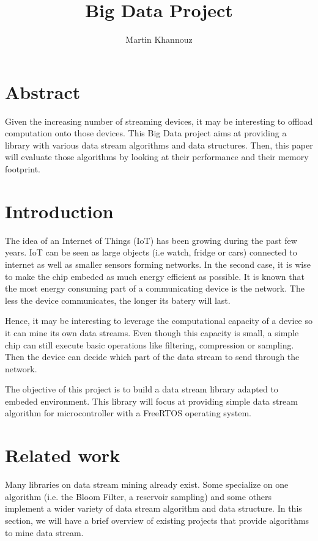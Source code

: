 \documentclass{article}
\title{Big Data Project}
\author{Martin Khannouz}
\begin{document}
\maketitle

\section*{Abstract}
Given the increasing number of streaming devices, it may be interesting to offload computation onto those devices.
This Big Data project aims at providing a library with various data stream algorithms and data structures.
Then, this paper will evaluate those algorithms by looking at their performance and their memory footprint.

\section{Introduction}
The idea of an Internet of Things (IoT) has been growing during the past few years.
IoT can be seen as large objects (i.e watch, fridge or cars) connected to internet as
well as smaller sensors forming networks.
In the second case, it is wise to make the chip embeded as much energy efficient as
possible. It is known that the most energy consuming part of a communicating device
is the network. The less the device communicates, the longer its batery will last.

Hence, it may be interesting to leverage the computational capacity of a device
so it can mine its own data streams. Even though this capacity is small, a simple
chip can still execute basic operations like filtering, compression or sampling.
Then the device can decide which part of the data stream to send through the
network.

The objective of this project is to build a data stream library adapted to embeded
environment. This library will focus at providing simple data stream algorithm
for microcontroller with a FreeRTOS operating system.

\section{Related work}
Many libraries on data stream mining already exist. Some specialize on one
algorithm (i.e. the Bloom Filter, a reservoir sampling) and some others implement
a wider variety of data stream algorithm and data structure. In this section, we will have a brief
overview of existing projects that provide algorithms to mine data stream.
\end{document}
